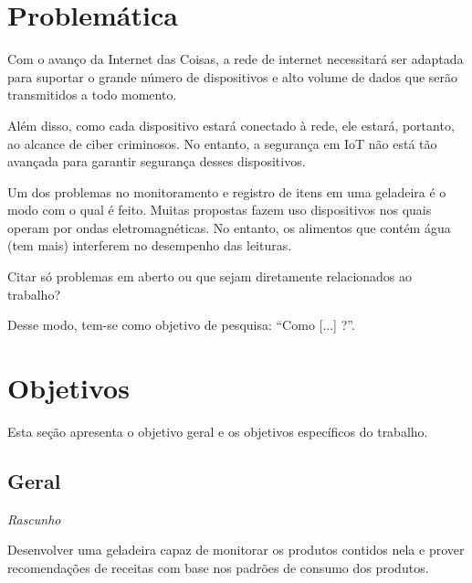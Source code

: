\section{Problemática}

Com o avanço da Internet das Coisas, a rede de internet necessitará ser adaptada para suportar o grande número de dispositivos e alto volume de dados que serão transmitidos a todo momento.

Além disso, como cada dispositivo estará conectado à rede, ele estará, portanto, ao alcance de ciber criminosos. No entanto, a segurança em IoT não está tão avançada para garantir segurança desses dispositivos.

Um dos problemas no monitoramento e registro de itens em uma geladeira é o modo com o qual é feito. Muitas propostas fazem uso dispositivos nos quais operam por ondas eletromagnéticas. No entanto, os alimentos que contém água (tem mais) interferem no desempenho das leituras.

Citar só problemas em aberto ou que sejam diretamente relacionados ao trabalho?


Desse modo, tem-se como objetivo de pesquisa: ``Como [...] ?''.

\section{Objetivos}
Esta seção apresenta o objetivo geral e os objetivos específicos do trabalho.

\subsection{Geral}

\textit{Rascunho}

Desenvolver uma geladeira capaz de monitorar os produtos contidos nela e prover recomendações de receitas com base nos padrões de consumo dos produtos.


